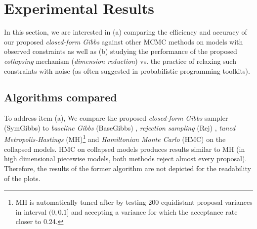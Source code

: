 \documentclass[letterpaper]{article}
\begin{document}
\section{Experimental Results}
\label{sect:experimental.results}
In this section, we are interested in (a) comparing the efficiency and accuracy of our proposed \emph{closed-form Gibbs} against other MCMC methods on  models with observed constraints as well as 
(b) studying the performance of the proposed \emph{collapsing} mechanism (\emph{dimension reduction}) vs. the practice of relaxing such constraints with noise
(as often suggested in probabilistic programming toolkits). 
%

\subsection{Algorithms compared} 

To address item (a), 
We compare the proposed \emph{closed-form Gibbs} sampler (SymGibbs) to
\emph{baseline Gibbs} (BaseGibbs) \cite{pearl1987evidential},
\emph{rejection sampling} (Rej) \cite{hammersley1964monte}, 
\emph{tuned Metropolis-Hastings} (MH)\footnote{MH is automatically tuned after \cite{roberts1997weak} by testing 200 equidistant proposal variances in interval $(0, 0.1]$ and accepting a variance for which the acceptance rate closer to 0.24.} %
and  
\emph{Hamiltonian Monte Carlo} (HMC) on the collapsed models.
HMC on collapsed models produces results similar to MH (in high dimensional piecewise models, both methods reject almost every proposal). Therefore, the results of the former algorithm are not depicted for the readability of the plots. 
\end{document}
